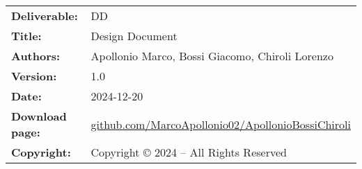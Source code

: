 \documentclass{Configuration_Files/PoliMi3i_thesis}
\begin{document}

\pagestyle{empty} %
\frontmatter %


\begin{table}[h!]
    \begin{tabu} to \textwidth { X[0.3,r,p] X[0.7,l,p] }
        \hline

        \textbf{Deliverable:}   & DD                                                                                                                  \\
        \textbf{Title:}         & Design Document                                                                                                     \\
        \textbf{Authors:}       & Apollonio Marco, Bossi Giacomo, Chiroli Lorenzo                                                                     \\
        \textbf{Version:}       & 1.0                                                                                                                 \\
        \textbf{Date:}          & 2024-12-20                                                                                                          \\
        \textbf{Download page:} & \href{https://github.com/MarcoApollonio02/ApollonioBossiChiroli}{github.com/MarcoApollonio02/ApollonioBossiChiroli} \\
        \textbf{Copyright:}     & Copyright © 2024 – All Rights Reserved                                                                              \\
        \hline
    \end{tabu}
\end{table}
\thispagestyle{empty} %
\end{document}
